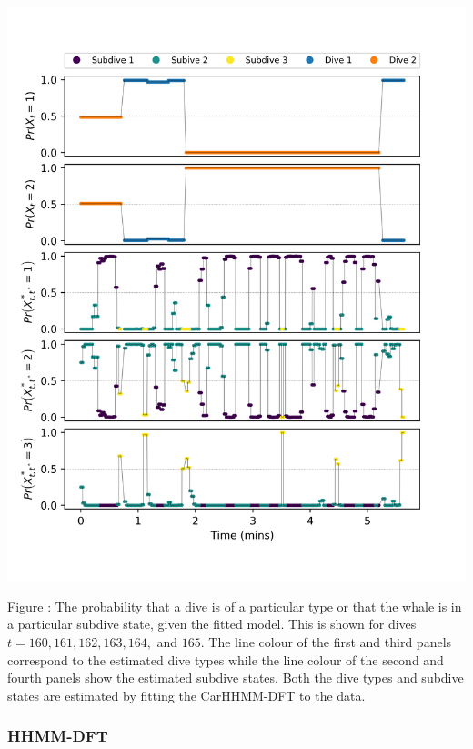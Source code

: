 \documentclass{article}
\begin{document}
        \begin{center}
        \includegraphics[width=6in]{../Plots/CarHHMM2_decoded_states.png}
        \end{center}
        
        \noindent Figure : The probability that a dive is of a particular type or that the whale is in a particular subdive state, given the fitted model. This is shown for dives $t = 160,161,162,163,164,$ and $165$. The line colour of the first and third panels correspond to the estimated dive types while the line colour of the second and fourth panels show the estimated subdive states. Both the dive types and subdive states are estimated by fitting the CarHHMM-DFT to the data.
        \addtocounter{fignum}{1}
        
        \subsubsection{HHMM-DFT}
        
\end{document}
